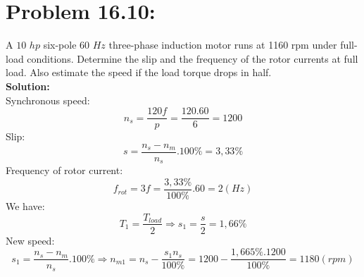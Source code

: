 \documentclass[9pt]{extarticle}
\begin{document}
      \section*{Problem 16.10:} A $10$ $hp$ six-pole $60$ $Hz$ three-phase induction motor runs at 1160 rpm under full-load 
      conditions. Determine the slip and the frequency of the rotor currents at full load.  Also estimate the speed if the load torque 
      drops in half.
      \\ \textbf{Solution:}\\
      Synchronous speed:
      $$n_{s}=\frac{120f}{p}=\frac{120.60}{6}=1200$$
      Slip:
      $$s=\frac{n_{s}-n_{m}}{n_{s}}.100\%=3,33\%$$
      Frequency of rotor current:
      $$f_{rot}=3f=\frac{3,33\%}{100\%}.60=2(Hz)$$
      We have:
      $$T_{1}=\frac{T_{load}}{2}\Rightarrow s_{1}=\frac{s}{2}=1,66\%$$
      New speed:
      $$s_{1}=\frac{n_{s}-n_{m}}{n_{s}}.100\%\Rightarrow n_{m1}=n_{s}-\frac{s_{1}n_{s}}{100\%}=1200-\frac{1,665\%.1200}{100\%}=1180 (rpm)$$ 
\end{document}
